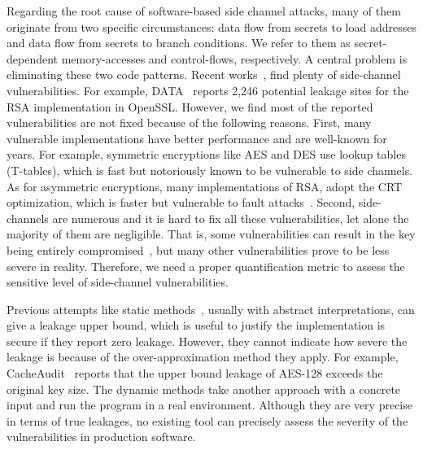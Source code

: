 Regarding the root cause of software-based side channel attacks, many of them originate
from two specific circumstances: data flow from secrets to load
addresses and data flow from secrets to branch conditions. We refer to them as
 secret-dependent memory-accesses and control-flows, respectively. A
central problem is eliminating these two code patterns. 
Recent
works~\cite{203878,217537,Wichelmann:2018:MFF:3274694.3274741,Brotzman19Casym,236338,182946},
find plenty of side-channel vulnerabilities. For example,
DATA~\cite{217537} reports 2,246 potential leakage sites for the RSA
implementation in OpenSSL\@. 
However, we find most of the reported vulnerabilities are not fixed because
of the following reasons.
First, many vulnerable implementations have better performance and 
are well-known for years. For example,
symmetric encryptions like AES and DES use lookup tables (T-tables), which
is fast but notoriously known to be vulnerable to side channels.
As for asymmetric encryptions, many implementations of RSA, adopt the CRT optimization,
which is faster but vulnerable to fault attacks~\cite{aumuller2002fault}.
Second, side-channels are numerous and it is hard to fix all these vulnerabilities,
let alone the majority of them are negligible. 
That is, some vulnerabilities can result in the key being 
entirely compromised~\cite{184415, aumuller2002fault}, but many other vulnerabilities prove to be less
severe in reality. Therefore, we need a proper quantification metric to 
assess the sensitive level of side-channel vulnerabilities.

Previous attempts like static methods~\cite{182946,5207642}, usually with
abstract interpretations, can give a leakage upper bound, which is useful to
justify the implementation is secure if they report zero leakage.
However, they cannot indicate how severe the leakage is because of the
over-approximation method they apply. For example, CacheAudit~\cite{182946} 
reports that the upper
bound leakage of AES-128 exceeds the original key size. The dynamic methods take
another approach with a concrete input and run the program in a real
environment. Although they are very precise in terms of true leakages, no
existing tool can precisely assess the severity of the vulnerabilities in production
software. 

